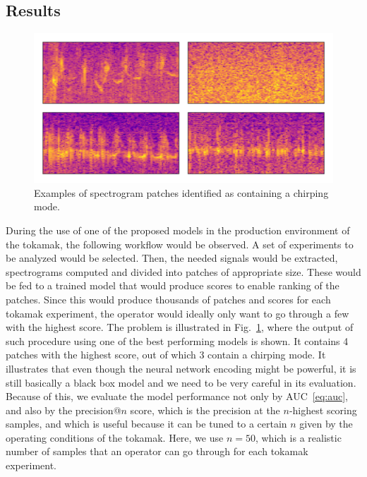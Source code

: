 \subsection{Results}
\begin{figure}
\begin{centering}
\includegraphics[scale=0.5]{data/chapter_alfven/anomalies.png}
\par
\end{centering}
\caption{Examples of spectrogram patches identified as containing a chirping
mode.}
\label{fig:alfven_patches}
\end{figure}

During the use of one of the proposed models in the production environment of the tokamak, the following workflow would be observed. A set of experiments to be analyzed would be selected. Then, the needed signals would be extracted, spectrograms computed and divided into patches of appropriate size. These would be fed to a trained model that would produce scores to enable ranking of the patches. Since this would produce thousands of patches and scores for each tokamak experiment, the operator would ideally only want to go through a few with the highest score. The problem is illustrated in Fig.~\ref{fig:alfven_patches}, where the output of such procedure using one of the best performing models is shown. It contains 4 patches with the highest score, out of which 3 contain a chirping mode. It illustrates that even though the neural network encoding might be powerful, it is still basically a black box model and we need to be very careful in its evaluation. Because of this, we evaluate the model performance not only by AUC~\eqref{eq:auc}, and also by the precision@$n$ score, which is the precision at the $n$-highest scoring samples, and which is useful because it can be tuned to a certain $n$ given by the operating conditions of the tokamak. Here, we use $n=50$, which is a realistic number of samples that an operator can go through for each tokamak experiment.

